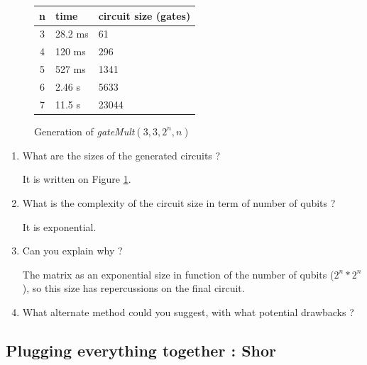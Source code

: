 \documentclass{article}
\theoremstyle{plain}
\begin{document}
      \begin{figure}[htb]
        \begin{center}

        \begin{tabular}{c|l|l}
          n & time & circuit size (gates) \\
          \hline
          3 & 28.2 ms & 61 \\
          4 & 120  ms & 296 \\
          5 & 527  ms & 1341 \\
          6 & 2.46  s & 5633 \\
          7 & 11.5  s & 23044
        \end{tabular}
      \label{tab:gateMult}
      \caption{Generation of \textit{gateMult}$(3, 3, 2^n, n)$}
      \end{center}
    \end{figure}

    \begin{enumerate}
      \item What are the sizes of the generated circuits ?

        It is written on Figure \ref{tab:gateMult}.

      \item What is the complexity of the circuit size in term of number of
        qubits ?

        It is exponential.

      \item Can you explain why ?

        The matrix as an exponential size in function of the number of qubits
        ($2^n * 2^n$), so this size has repercussions on the final circuit.

      \item What alternate method could you suggest, with what potential
        drawbacks ?
    \end{enumerate}

    \subsection{Plugging everything together : Shor}
\end{document}
